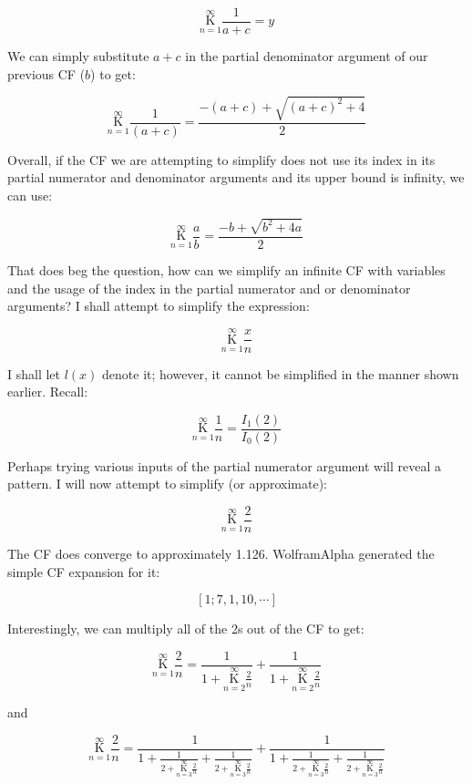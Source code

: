 \documentclass{article}
\begin{document}
$$\underset{n=1}{\overset{\infty}{\mathrm K}} \frac{1}{a+c} = y$$

We can simply substitute $a+c$ in the partial denominator argument of our previous CF ($b$) to get:

$$\underset{n=1}{\overset{\infty}{\mathrm K}} \frac{1}{(a+c)} =  \frac{-(a+c) + \sqrt{(a+c)^2+4}}{2}$$

Overall, if the CF we are attempting to simplify does not use its index in its partial numerator and denominator arguments and its upper bound is infinity, we can use:

$$\underset{n=1}{\overset{\infty}{\mathrm K}} \frac{a}{b} = \frac{-b + \sqrt{b^2+4a}}{2}$$

That does beg the question, how can we simplify an infinite CF with variables and the usage of the index in the partial numerator and or denominator arguments? I shall attempt to simplify the expression:

$$\underset{n=1}{\overset{\infty}{\mathrm K}} \frac{x}{n}$$

I shall let $l(x)$ denote it; however, it cannot be simplified in the manner shown earlier. Recall:

$$\underset{n=1}{\overset{\infty}{\mathrm K}} \frac{1}{n}=\frac{I_1(2)}{I_0(2)}$$

Perhaps trying various inputs of the partial numerator argument will reveal a pattern. I will now attempt to simplify (or approximate):

$$\underset{n=1}{\overset{\infty}{\mathrm K}} \frac{2}{n}$$

The CF does converge to approximately 1.126. WolframAlpha generated the simple CF expansion for it:

$$[1;7,1,10,\cdots]$$

Interestingly, we can multiply all of the 2s out of the CF to get:

$$\underset{n=1}{\overset{\infty}{\mathrm K}} \frac{2}{n} = \frac{1}{1+\underset{n=2}{\overset{\infty}{\mathrm K}} \frac{2}{n}}+\frac{1}{1+\underset{n=2}{\overset{\infty}{\mathrm K}} \frac{2}{n}}$$

and

$$\underset{n=1}{\overset{\infty}{\mathrm K}} \frac{2}{n} = \frac{1}{1+\frac{1}{2+\underset{n=3}{\overset{\infty}{\mathrm K}} \frac{2}{n}}+\frac{1}{2+\underset{n=3}{\overset{\infty}{\mathrm K}} \frac{2}{n}}} + \frac{1}{1+\frac{1}{2+\underset{n=3}{\overset{\infty}{\mathrm K}} \frac{2}{n}}+\frac{1}{2+\underset{n=3}{\overset{\infty}{\mathrm K}} \frac{2}{n}}}$$
\end{document}

